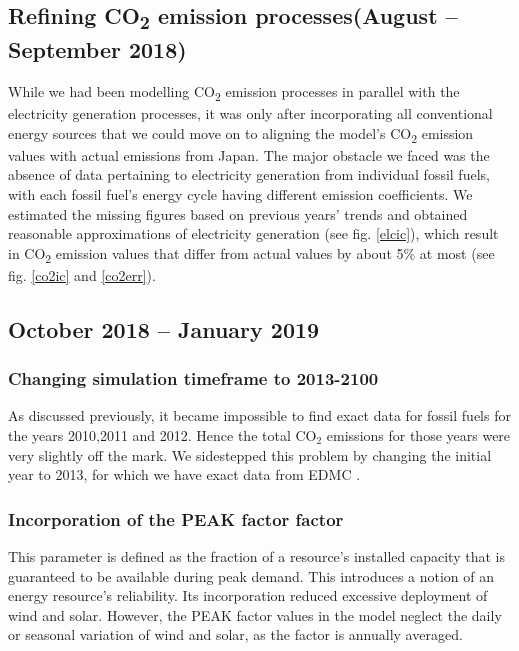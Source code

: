 \documentclass[14pt,a4paper]{article} %
\begin{document}
\subsection{Refining CO\textsubscript{2} emission processes(August – September 2018)}
While we had been modelling CO\textsubscript{2} emission processes in parallel with the electricity generation processes, it was only after incorporating all conventional energy sources that we could move on to aligning the model's CO\textsubscript{2} emission values with actual emissions from Japan. The major obstacle we faced was the absence of data pertaining to electricity generation from individual fossil fuels, with each fossil fuel's energy cycle having different emission coefficients. We estimated the missing figures based on previous years' trends \cite{noauthor_energy_2018,noauthor_national_2018} and obtained reasonable approximations of electricity generation (see fig. \ref{elcic}), which result in CO\textsubscript{2} emission values that differ from actual values by about 5\% at most (see fig. \ref{co2ic} and \ref{co2err}).\\

\subsection{October 2018 – January 2019}

\subsubsection{Changing simulation timeframe to 2013-2100}
As discussed previously, it became impossible to find exact data for fossil fuels for the years 2010,2011 and 2012. Hence the total CO$_2$ emissions for those years were very slightly off the mark. We sidestepped this problem by changing the initial year to 2013, for which we have exact data from \gls{EDMC} \cite{noauthor_energy_2018}.

\subsubsection{Incorporation of the \gls{PEAK} factor \cite{gargiulo_documentation_2005} factor}
This parameter is defined as the fraction of a resource's installed capacity that is guaranteed to be available during peak demand. This introduces a notion of an energy resource's reliability. Its incorporation reduced excessive deployment of wind and solar. However, the \gls{PEAK} factor values in the model \cite{kato_energy_2016} neglect the daily or seasonal variation of wind and solar, as the factor is annually averaged.
\end{document}
